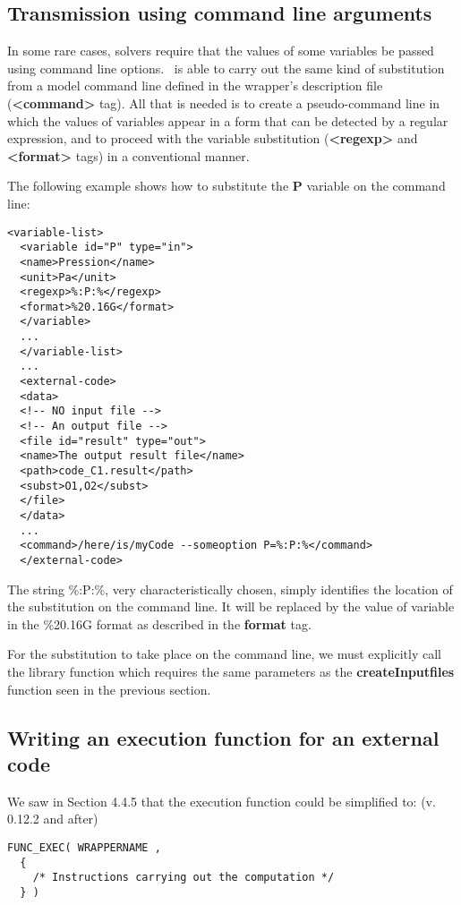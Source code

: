 \subsection{Transmission using command line arguments}

In some rare cases, solvers require that the values of some variables be passed using command line options. \OT\ is able to carry out the same kind of substitution from a model command line defined in the wrapper's description file ({\bf <command>} tag). All that is needed is to create a pseudo-command line in which the values of variables appear in a form that can be detected by a regular expression, and to proceed with the variable substitution ({\bf <regexp>} and {\bf <format>} tags) in a conventional manner.

The following example shows how to substitute the {\bf P} variable on the command line:

\lstset{language=XML, basicstyle=\normalsize}
\begin{lstlisting}[frame=TBRL]
  <variable-list>
  <variable id="P" type="in">
  <name>Pression</name>
  <unit>Pa</unit>
  <regexp>%:P:%</regexp>
  <format>%20.16G</format>
  </variable>
  ...
  </variable-list>
  ...
  <external-code>
  <data>
  <!-- NO input file -->
  <!-- An output file -->
  <file id="result" type="out">
  <name>The output result file</name>
  <path>code_C1.result</path>
  <subst>O1,O2</subst>
  </file>
  </data>
  ...
  <command>/here/is/myCode --someoption P=%:P:%</command>
  </external-code>
\end{lstlisting}

The string \%:P:\%, very characteristically chosen, simply identifies the location of the substitution on the command line. It will be replaced by the value of variable in the \%20.16G format as described in the {\bf format} tag.

For the substitution to take place on the command line, we must explicitly call the library function  which requires the same parameters as the {\bf createInputfiles} function seen in the previous section.

\subsection{Writing an execution function for an external code}

We saw in Section 4.4.5 that the execution function could be simplified to: (v. 0.12.2 and after)
\lstset{language=C++, basicstyle=\normalsize}
\begin{lstlisting}[frame=TBRL]
  FUNC_EXEC( WRAPPERNAME ,
  {
    /* Instructions carrying out the computation */
  } )
\end{lstlisting}

